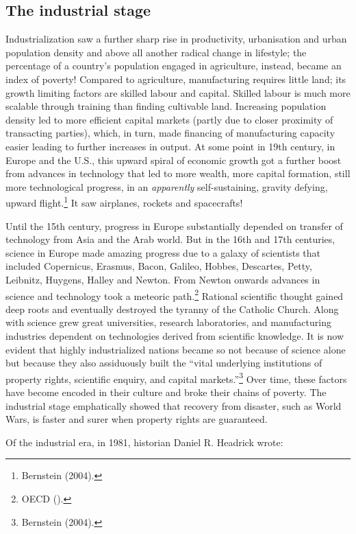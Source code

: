 \begin{multicols}{2}
\subsection*{The industrial stage}

Industrialization saw a further sharp rise in productivity, urbanisation and urban population density and above all another radical change in lifestyle; the percentage of a country's population engaged in agriculture, instead, became an index of poverty! Compared to agriculture, manufacturing requires little land; its growth limiting factors are skilled labour and capital. Skilled labour is much more scalable through training than finding cultivable land. Increasing population density led to more efficient capital markets (partly due to closer proximity of transacting parties), which, in turn, made financing of manufacturing capacity easier leading to further increases in output. At some point in 19th century, in Europe and the U.S., this upward spiral of economic growth got a further boost from advances in technology that led to more wealth, more capital formation, still more technological progress, in an \textit{apparently} self-sustaining, gravity defying, upward flight.\footnote{Bernstein (2004).} It saw airplanes, rockets and spacecrafts!

Until the 15th century, progress in Europe substantially depended on transfer of technology from Asia and the Arab world. But in the 16th and 17th centuries, science in Europe made amazing progress due to a galaxy of scientists that included Copernicus, Erasmus, Bacon, Galileo, Hobbes, Descartes, Petty, Leibnitz, Huygens, Halley and Newton. From Newton onwards advances in science and technology took a meteoric path.\footnote{OECD ().} Rational scientific thought gained deep roots and eventually destroyed the tyranny of the Catholic Church. Along with science grew great universities, research laboratories, and manufacturing industries dependent on technologies derived from scientific knowledge. It is now evident that highly industrialized nations became so not because of science alone but because they also assiduously built the “vital underlying institutions of property rights, scientific enquiry, and capital markets.”\footnote{Bernstein (2004).} Over time, these factors have become encoded in their culture and broke their chains of poverty. The industrial stage emphatically showed that recovery from disaster, such as World Wars, is faster and surer when property rights are guaranteed.

Of the industrial era, in 1981, historian Daniel R. Headrick wrote:
\smallskip


\end{multicols}
